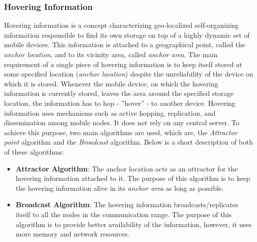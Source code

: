 \subsubsection{Hovering Information \cite{Castro2009}}
Hovering information is a concept characterizing geo-localized self-organizing information responsible to find its own storage on top of a highly dynamic set of mobile devices. This information is attached to a geographical point, called the \textit{anchor location}, and to its vicinity area, called \textit{anchor area}. The main requirement of a single piece of hovering information is to keep itself stored at some specified location (\textit{anchor location}) despite the unreliability of the device on which it is stored. Whenever the mobile device, on which the hovering information is currently stored, leaves the area around the specified storage location, the information has to hop - ”hover” - to another device.
Hovering information uses mechanisms such as active hopping, replication, and dissemination among mobile nodes. It does not rely on any central server. To achieve this purpose, two main algorithms are used, which are, the \textit{Attractor point} algorithm and the \textit{Broadcast} algorithm. Below is a short description of both of these algorithms:
\begin{itemize}
  \item \textbf{Attractor Algorithm}: The anchor location acts as an attractor for the hovering information attached to it. The purpose of this algorithm is to keep the hovering information alive in its \textit{anchor area} as long as possible.
  \item \textbf{Broadcast Algorithm}: The hovering information broadcasts/replicates itself to all the nodes in the communication range. The purpose of this algorithm is to provide better availability of the information, however, it uses more memory and network resources.
\end{itemize}

